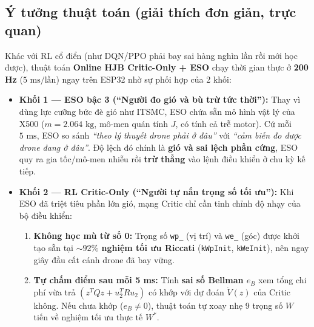 \documentclass[11pt,a4paper]{article}
\begin{document}
\subsection{Ý tưởng thuật toán (giải thích đơn giản, trực quan)}
Khác với RL cổ điển (như DQN/PPO phải bay sai hàng nghìn lần rồi mới học được), thuật toán \textbf{Online HJB Critic-Only + ESO} chạy thời gian thực ở \textbf{200 Hz} ($5\text{ ms/lần}$) ngay trên ESP32 nhờ sự phối hợp của 2 khối:
\begin{itemize}
    \item \textbf{Khối 1 — ESO bậc 3 (``Người đo gió và bù trừ tức thời''):} Thay vì dùng lực cưỡng bức đè gió như ITSMC, ESO chứa sẵn mô hình vật lý của X500 ($m = 2.064\text{ kg}$, mô-men quán tính $J$, có tính cả trễ motor). Cứ mỗi $5\text{ ms}$, ESO so sánh \emph{``theo lý thuyết drone phải ở đâu''} với \emph{``cảm biến đo được drone đang ở đâu''}. Độ lệch đó chính là \textbf{gió và sai lệch phần cứng}, ESO quy ra gia tốc/mô-men nhiễu rồi \textbf{trừ thẳng} vào lệnh điều khiển ở chu kỳ kế tiếp.
    \item \textbf{Khối 2 — RL Critic-Only (``Người tự nắn trọng số tối ưu''):} Khi ESO đã triệt tiêu phần lớn gió, mạng Critic chỉ cần tinh chỉnh độ nhạy của bộ điều khiển:
    \begin{enumerate}[leftmargin=1.4em, itemsep=0.2em]
        \item \textbf{Không học mù từ số 0:} Trọng số \texttt{wp\_} (vị trí) và \texttt{we\_} (góc) được khởi tạo sẵn tại \textbf{$\sim 92\%$ nghiệm tối ưu Riccati} (\texttt{kWpInit}, \texttt{kWeInit}), nên ngay giây đầu cất cánh drone đã bay vững.
        \item \textbf{Tự chấm điểm sau mỗi 5 ms:} Tính \textbf{sai số Bellman $e_B$} xem tổng chi phí vừa trả $(z^T Q z + u_2^T R u_2)$ có khớp với dự đoán $\dot{V}(z)$ của Critic không. Nếu chưa khớp ($e_B \neq 0$), thuật toán tự xoay nhẹ 9 trọng số $W$ tiến về nghiệm tối ưu thực tế $W^*$.
    \end{enumerate}
\end{itemize}
\end{document}
